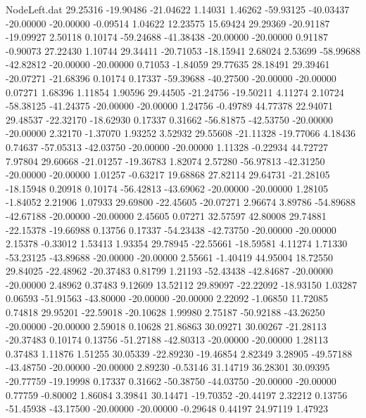 \begin{filecontents}{NodeLeft.dat}
  29.25316  -19.90486  -21.04622     1.14031    1.46262  -59.93125  -40.03437  -20.00000  -20.00000   -0.09514    1.04622   12.23575   15.69424
  29.29369  -20.91187  -19.09927     2.50118    0.10174  -59.24688  -41.38438  -20.00000  -20.00000    0.91187   -0.90073   27.22430    1.10744
  29.34411  -20.71053  -18.15941     2.68024    2.53699  -58.99688  -42.82812  -20.00000  -20.00000    0.71053   -1.84059   29.77635   28.18491
  29.39461  -20.07271  -21.68396     0.10174    0.17337  -59.39688  -40.27500  -20.00000  -20.00000    0.07271    1.68396    1.11854    1.90596
  29.44505  -21.24756  -19.50211     4.11274    2.10724  -58.38125  -41.24375  -20.00000  -20.00000    1.24756   -0.49789   44.77378   22.94071
  29.48537  -22.32170  -18.62930     0.17337    0.31662  -56.81875  -42.53750  -20.00000  -20.00000    2.32170   -1.37070    1.93252    3.52932
  29.55608  -21.11328  -19.77066     4.18436    0.74637  -57.05313  -42.03750  -20.00000  -20.00000    1.11328   -0.22934   44.72727    7.97804
  29.60668  -21.01257  -19.36783     1.82074    2.57280  -56.97813  -42.31250  -20.00000  -20.00000    1.01257   -0.63217   19.68868   27.82114
  29.64731  -21.28105  -18.15948     0.20918    0.10174  -56.42813  -43.69062  -20.00000  -20.00000    1.28105   -1.84052    2.21906    1.07933
  29.69800  -22.45605  -20.07271     2.96674    3.89786  -54.89688  -42.67188  -20.00000  -20.00000    2.45605    0.07271   32.57597   42.80008
  29.74881  -22.15378  -19.66988     0.13756    0.17337  -54.23438  -42.73750  -20.00000  -20.00000    2.15378   -0.33012    1.53413    1.93354
  29.78945  -22.55661  -18.59581     4.11274    1.71330  -53.23125  -43.89688  -20.00000  -20.00000    2.55661   -1.40419   44.95004   18.72550
  29.84025  -22.48962  -20.37483     0.81799    1.21193  -52.43438  -42.84687  -20.00000  -20.00000    2.48962    0.37483    9.12609   13.52112
  29.89097  -22.22092  -18.93150     1.03287    0.06593  -51.91563  -43.80000  -20.00000  -20.00000    2.22092   -1.06850   11.72085    0.74818
  29.95201  -22.59018  -20.10628     1.99980    2.75187  -50.92188  -43.26250  -20.00000  -20.00000    2.59018    0.10628   21.86863   30.09271
  30.00267  -21.28113  -20.37483     0.10174    0.13756  -51.27188  -42.80313  -20.00000  -20.00000    1.28113    0.37483    1.11876    1.51255
  30.05339  -22.89230  -19.46854     2.82349    3.28905  -49.57188  -43.48750  -20.00000  -20.00000    2.89230   -0.53146   31.14719   36.28301
  30.09395  -20.77759  -19.19998     0.17337    0.31662  -50.38750  -44.03750  -20.00000  -20.00000    0.77759   -0.80002    1.86084    3.39841
  30.14471  -19.70352  -20.44197     2.32212    0.13756  -51.45938  -43.17500  -20.00000  -20.00000   -0.29648    0.44197   24.97119    1.47923

\end{filecontents}

